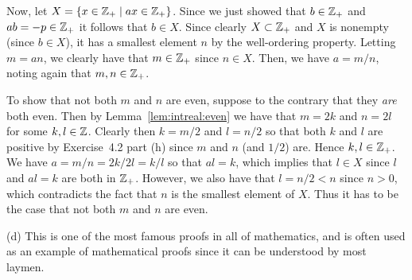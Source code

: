 {{    Now, let $X = \left\{ x \in {{\mathbb{Z}}_+} \mid a x \in {{\mathbb{Z}}_+} \right\}$.
    Since we just showed that $b \in {{\mathbb{Z}}_+}$ and $a b = -p \in {{\mathbb{Z}}_+}$ it follows that $b \in X$.
    Since clearly $X \subset {{\mathbb{Z}}_+}$ and $X$ is nonempty (since $b \in X$), it has a smallest element $n$ by the well-ordering property.
    Letting $m = an$, we clearly have that $m \in {{\mathbb{Z}}_+}$ since $n \in X$.
    Then, we have $a = m/n$, noting again that $m,n \in {{\mathbb{Z}}_+}$.

    To show that not both $m$ and $n$ are even, suppose to the contrary that they \emph{are} both even.
    Then by Lemma~\ref{lem:intreal:even} we have that $m = 2k$ and $n = 2l$ for some $k,l \in {\mathbb{Z}}$.
    Clearly then $k = m/2$ and $l = n/2$ so that both $k$ and $l$ are positive by Exercise~4.2 part (h) since $m$ and $n$ (and $1/2$) are.
    Hence $k,l \in {{\mathbb{Z}}_+}$.
    We have $a = m/n = 2k/2l = k/l$ so that $al = k$, which implies that $l \in X$ since $l$ and $al=k$ are both in ${{\mathbb{Z}}_+}$.
    However, we also have that $l = n/2 < n$ since $n > 0$, which contradicts the fact that $n$ is the smallest element of $X$.
    Thus it has to be the case that not both $m$ and $n$ are even.
  }

  (d) This is one of the most famous proofs in all of mathematics, and is often used as an example of mathematical proofs since it can be understood by most laymen.
}
